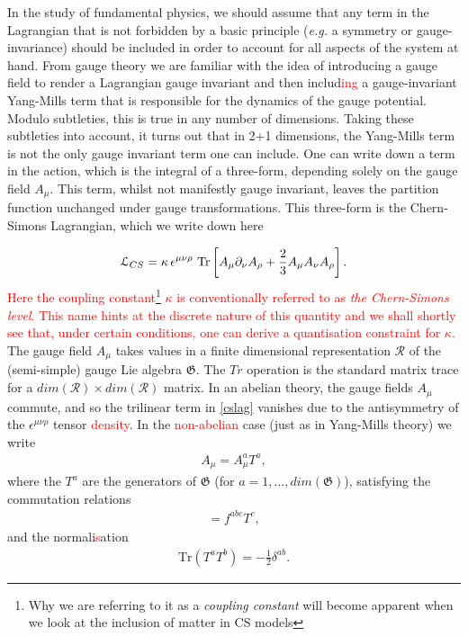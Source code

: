     In the study of fundamental physics, we should assume that any term in the Lagrangian that is not forbidden by a basic principle (\textit{e.g.} a symmetry or gauge-invariance) should be included in order to account for all aspects of the system at hand. From gauge theory we are familiar with the idea of introducing a gauge field to render a Lagrangian gauge invariant and then includ\textcolor{red}{ing} a gauge-invariant Yang-Mills term that is responsible for the dynamics of the gauge potential. Modulo subtleties, this is true in any number of dimensions. Taking these subtleties into account, it turns out that in 2+1 dimensions, the Yang-Mills term is not the only gauge invariant term one can include. One can write down a term in the action, which is the integral of a three-form, depending solely on the gauge field $A_{\mu}$. This term, whilst not manifestly gauge invariant, leaves the partition function unchanged under gauge transformations. This three-form is the Chern-Simons Lagrangian, which we write down here

\begin{equation}
    {\mathcal{L}}_{CS}= \kappa \, \epsilon^{\mu\nu\rho} \  \mathrm{Tr} \left[ A_\mu\partial_\nu A_\rho +{2\over 3} A_\mu A_\nu A_\rho \right].
\label{cslag}
\end{equation}
 \textcolor{red}{Here the coupling constant\footnote{Why we are referring to it as a \textit{coupling constant} will become apparent when we look at the inclusion of matter in CS models} $\kappa$ is conventionally referred to as \textit{the Chern-Simons level}. This name hints at the discrete nature of this quantity and we shall shortly see that, under certain conditions, one can derive a quantisation constraint for $\kappa$.} The gauge field $A_\mu$ takes values in a finite dimensional representation $\mathcal{R}$ of the (semi-simple) gauge Lie algebra ${\mathfrak{G}}$. The $Tr$ operation is the standard matrix trace for a $dim(\mathcal{R})\times dim(\mathcal{R})$ matrix.  In an abelian theory, the gauge fields
$A_\mu$ commute, and so the trilinear term in \eqref{cslag} vanishes due to the
antisymmetry of the $\epsilon^{\mu\nu\rho}$ tensor \textcolor{red}{density}. In the \textcolor{red}{non-abelian} case (just as in Yang-Mills theory) we write
\begin{align}
    A_\mu=A_\mu^a T^a,
\end{align}
 where the $T^a$ are the generators of ${\mathfrak{G}}$ (for $a=1,\dots, dim({\mathfrak{G}})$), satisfying the commutation relations
 \begin{align}
    [T^a,T^b]=f^{abc}T^c,
 \end{align}
and the normali\textcolor{red}{s}ation 
\begin{align}
    \mathrm{Tr}(T^a T^b)=-\frac{1}{2}\delta^{ab}.
\end{align}

